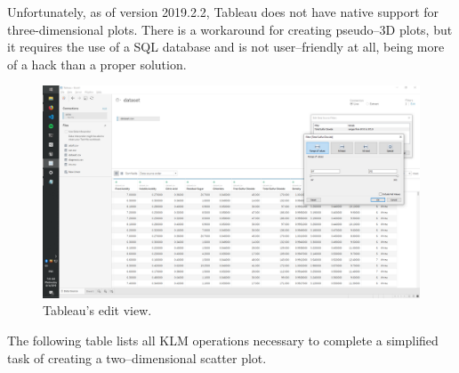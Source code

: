 \documentclass{article}
\begin{document}
\newpage

Unfortunately, as of version 2019.2.2, Tableau does not have native support for three-dimensional plots. There is a workaround for creating pseudo--3D plots, but it requires the use of a SQL database and is not user--friendly at all, being more of a hack than a proper solution.\cite{tableau3d}\\

\begin{figure}[!h]
\centering
\includegraphics[scale=0.25]{images/tableau_edit}
\caption{Tableau's edit view.}
\label{fig:tableauedit}
\end{figure}

The following table lists all KLM operations necessary to complete a simplified task of creating a two--dimensional scatter plot.\\
\end{document}
